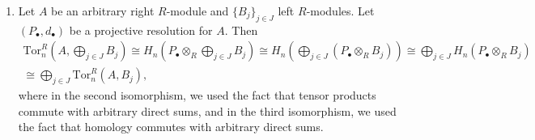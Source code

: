 \documentclass{article}
\newcommand{\tor}{\text{Tor}}
\begin{document}
\begin{enumerate}[itemsep =-2pt,label = (\alph{*})]
		\begin{equation*}
			0 \to \prod_{i \in I}A \xrightarrow{\prod_{i \in I}\epsilon} \prod_{i \in I} Q_{0}^{(i)} \xrightarrow{\prod_{i \in I}d_{1}^{(i)}} \dotsm \xrightarrow{\prod_{i \in I}d_{n-1}^{(i)}} \prod_{i \in I}Q_{n}^{(i)}\xrightarrow{\prod_{i \in I}d_{n}^{(i)}} \dotsm
		\end{equation*}
		is exact. But since kernels and images commute with products, by injectivity of each resolution, we observe that 
		\begin{equation*}
			\ker{\prod_{i \in I}d_{n}^{(i)}} \cong \prod_{i \in I}\ker{d_{n}^{(i)}} \cong \prod_{i \in I}\operatorname{image}{d_{n + 1}^{(i)}} \cong \operatorname{image}{\prod_{i \in I}d_{n + 1}^{(i)}},
		\end{equation*}
		and so the sequence is indeed exact. Therefore, the arbitrary direct product of injective resolutions is an injective resolution. Now, we will show that $\operatorname{Ext}^{n}_{R}(A, \prod_{j \in J}B_{j}) \cong \prod_{j \in J}\operatorname{Ext}_{R}^{n}(A, B_{j})$. Let $\{(Q_{\bullet}^{(j)}, d_{\bullet}^{(j)})\}_{j \in J}$ be a collection of injective resolutions for each $B_{j}$. By our work above, $$\left(\prod_{j \in J}Q_{\bullet}^{(j)}, \prod_{j \in J}d_{\bullet}^{(j)}\right)$$ is an injective resolution for $\prod_{j \in J}B_{j}$. Then by definition 
		\begin{multline*}
			\operatorname{Ext}_{R}^{n}\left(A, \prod_{j \in J}B_{j}\right)\coloneqq H^{n}\left(\operatorname{Hom}_{R}\left(A, \prod_{j \in J}Q_{\bullet}^{(j)}\right)\right) \cong H^{n}\left(\prod_{j \in J}\operatorname{Hom}_{R}(A,Q_{\bullet}^{(j)})\right) \\
			\cong \prod_{j \in J}H^{n}\left(\operatorname{Hom}_{R}(A, Q_{\bullet}^{(j)})\right) \eqqcolon \prod_{j \in J}\operatorname{Ext}_{R}^{n}\left(A, B_{j}\right), 
		\end{multline*}
		where the first isomorphism follows from Exercise 12 in Section 10.5. 
		\item Let $A$ be an arbitrary right $R$-module and $\{B_{j}\}_{j \in J}$ left $R$-modules. Let $(P_{\bullet}, d_{\bullet})$ be a projective resolution for $A$. Then 
		\begin{multline*}
			\tor_{n}^{R}\left(A, \bigoplus_{j \in J}B_{j}\right) \cong H_{n}\left(P_{\bullet} \otimes_{R} \bigoplus_{j \in J}B_{j}\right) \cong H_{n}\left(\bigoplus_{j \in J}(P_{\bullet} \otimes_{R} B_{j})\right) \cong \bigoplus_{j \in J}H_{n}(P_{\bullet} \otimes_{R} B_{j}) \\ \cong \bigoplus_{j \in J} \tor_{n}^{R}(A, B_{j}), 
		\end{multline*}
		where in the second isomorphism, we used the fact that tensor products commute with arbitrary direct sums, and in the third isomorphism, we used the fact that homology commutes with arbitrary direct sums. 
	\end{enumerate}
	
\end{document}
